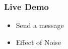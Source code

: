 \documentclass{beamer}
\begin{document}
\frame
{
  \frametitle{Live Demo}
  \begin{itemize}
    \item Send a message
    \item Effect of Noise
  \end{itemize}
}



\end{document}
